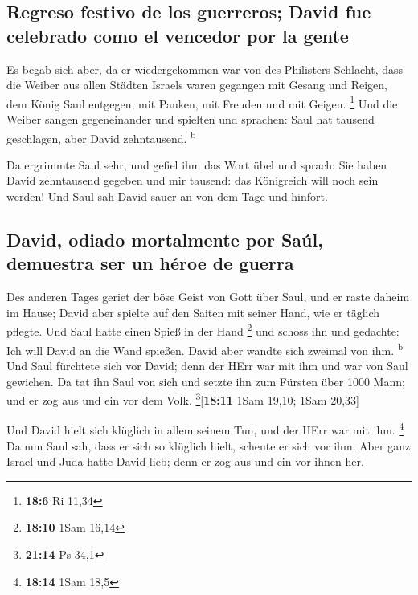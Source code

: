 \hypertarget{regreso-festivo-de-los-guerreros-david-fue-celebrado-como-el-vencedor-por-la-gente}{%
\subsection{Regreso festivo de los guerreros; David fue celebrado como
el vencedor por la
gente}\label{regreso-festivo-de-los-guerreros-david-fue-celebrado-como-el-vencedor-por-la-gente}}

 Es begab sich aber, da er wiedergekommen war von des
Philisters Schlacht, dass die Weiber aus allen Städten Israels waren
gegangen mit Gesang und Reigen, dem König Saul entgegen, mit Pauken, mit
Freuden und mit Geigen. \footnote{\textbf{18:6} Ri 11,34} 
Und die Weiber sangen gegeneinander und spielten und sprachen: Saul hat
tausend geschlagen, aber David zehntausend. \textsuperscript{b}

 Da ergrimmte Saul sehr, und gefiel ihm das Wort übel und
sprach: Sie haben David zehntausend gegeben und mir tausend: das
Königreich will noch sein werden!  Und Saul sah David
sauer an von dem Tage und hinfort.

\hypertarget{david-odiado-mortalmente-por-sauxfal-demuestra-ser-un-huxe9roe-de-guerra}{%
\subsection{David, odiado mortalmente por Saúl, demuestra ser un héroe
de
guerra}\label{david-odiado-mortalmente-por-sauxfal-demuestra-ser-un-huxe9roe-de-guerra}}

 Des anderen Tages geriet der böse Geist von Gott über
Saul, und er raste daheim im Hause; David aber spielte auf den Saiten
mit seiner Hand, wie er täglich pflegte. Und Saul hatte einen Spieß in
der Hand \footnote{\textbf{18:10} 1Sam 16,14}  und schoss
ihn und gedachte: Ich will David an die Wand spießen. David aber wandte
sich zweimal von ihm. \textsuperscript{b}  Und Saul
fürchtete sich vor David; denn der HErr war mit ihm und war von Saul
gewichen.  Da tat ihn Saul von sich und setzte ihn zum
Fürsten über 1000 Mann; und er zog aus und ein vor dem Volk.
\footnote{\textbf{21:14} Ps 34,1}{[}\textbf{18:11} 1Sam 19,10; 1Sam
20,33{]}

 Und David hielt sich klüglich in allem seinem Tun, und
der HErr war mit ihm. \footnote{\textbf{18:14} 1Sam 18,5}
 Da nun Saul sah, dass er sich so klüglich hielt, scheute
er sich vor ihm.  Aber ganz Israel und Juda hatte David
lieb; denn er zog aus und ein vor ihnen her.

